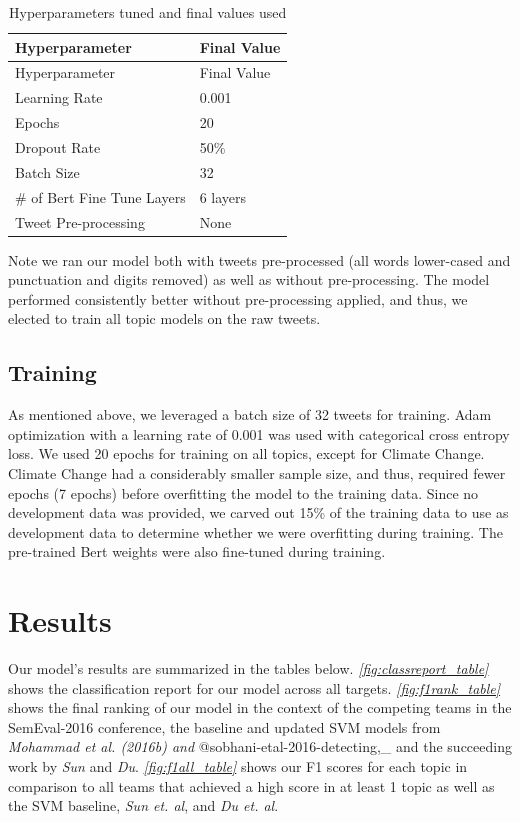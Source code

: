\documentclass[]{article}
\begin{document}
\begin{longtable}[]{@{}ll@{}}
\caption{\label{fig:hyperparam_table} Hyperparameters tuned and final
values used}\tabularnewline
\toprule
Hyperparameter & Final Value\tabularnewline
\midrule
\endfirsthead
\toprule
Hyperparameter & Final Value\tabularnewline
\midrule
\endhead
Learning Rate & 0.001\tabularnewline
Epochs & 20\tabularnewline
Dropout Rate & 50\%\tabularnewline
Batch Size & 32\tabularnewline
\# of Bert Fine Tune Layers & 6 layers\tabularnewline
Tweet Pre-processing & None\tabularnewline
\bottomrule
\end{longtable}

Note we ran our model both with tweets pre-processed (all words
lower-cased and punctuation and digits removed) as well as without
pre-processing. The model performed consistently better without
pre-processing applied, and thus, we elected to train all topic models
on the raw tweets.

\hypertarget{training}{%
\subsection{Training}\label{training}}

As mentioned above, we leveraged a batch size of 32 tweets for training.
Adam optimization with a learning rate of 0.001 was used with
categorical cross entropy loss. We used 20 epochs for training on all
topics, except for Climate Change. Climate Change had a considerably
smaller sample size, and thus, required fewer epochs (7 epochs) before
overfitting the model to the training data. Since no development data
was provided, we carved out 15\% of the training data to use as
development data to determine whether we were overfitting during
training. The pre-trained Bert weights were also fine-tuned during
training.

\hypertarget{results}{%
\section{Results}\label{results}}

Our model's results are summarized in the tables below.
\emph{\autoref{fig:classreport_table}} shows the classification report
for our model across all targets. \emph{\autoref{fig:f1rank_table}}
shows the final ranking of our model in the context of the competing
teams in the SemEval-2016 conference, the baseline and updated SVM
models from \emph{Mohammad et al. (2016b) and
}@sobhani-etal-2016-detecting,\_ and the succeeding work by \emph{Sun}
and \emph{Du}. \emph{\autoref{fig:f1all_table}} shows our F1 scores for
each topic in comparison to all teams that achieved a high score in at
least 1 topic as well as the SVM baseline, \emph{Sun et. al}, and
\emph{Du et. al}.
\end{document}
